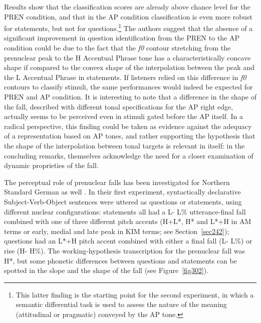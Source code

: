 Results show that the classification scores are already above chance level for the PREN condition, and that in the AP condition classification is even more robust for statements, but not for questions.\footnote{This latter finding is the starting point for the second experiment, in which a semantic differential task is used to assess the nature of the meaning (attitudinal or pragmatic) conveyed by the AP tone.} The authors suggest that the absence of a significant improvement in question identification from the PREN to the AP condition could be due to the fact that the \textit{f0} contour stretching from the prenuclear peak to the H Accentual Phrase tone has a characteristically concave shape if compared to the convex shape of the interpolation between the peak and the L Accentual Phrase in statements. If listeners relied on this difference in \textit{f0} contours to classify stimuli, the same performances would indeed be expected for PREN and AP condition. It is interesting to note that a difference in the shape of the fall, described with different tonal specifications for the AP right edge, actually seems to be perceived even in stimuli gated before the AP itself. In a radical perspective, this finding could be taken as evidence against the adequacy of a representation based on AP tones, and rather supporting the hypothesis that the shape of the interpolation between tonal targets is relevant in itself: in the concluding remarks, \citeauthor{petrone2011tones} themselves acknowledge the need for a closer examination of dynamic proprieties of the fall.

The perceptual role of prenuclear falls has been investigated for Northern Standard German as well \citep{petrone2014intonation}. In their first experiment, syntactically declarative Subject-Verb-Object sentences were uttered as questions or statements, using different nuclear configurations: statements all had a L- L\% utterance-final fall combined with one of three different pitch accents (H+L*, H* and L*+H in AM terms or early, medial and late peak in KIM terms; see Section~\ref{sec242}); questions had an L*+H pitch accent combined with either a final fall (L- L\%) or rise (H- H\%). The working-hypothesis transcription for the prenuclear fall was H*, but some phonetic differences between questions and statements can be spotted in the slope and the shape of the fall (see Figure~\ref{fig302}).

